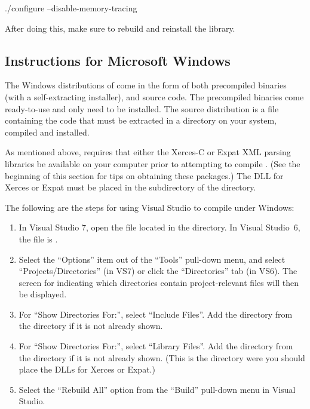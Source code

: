 \documentclass{sbmlmanual}
\begin{document}
\begin{example}[csh]
  ./configure --disable-memory-tracing
\end{example}

After doing this, make sure to rebuild and reinstall the \libsbml{} library.


\subsection{Instructions for Microsoft Windows}

The Windows distributions of \libsbml{} come in the form of both
precompiled binaries (with a self-extracting installer), and source code.
The precompiled binaries come ready-to-use and only need to be installed.
The source distribution is a  file containing the \libsbml{}
code that must be extracted in a directory on your system, compiled and
installed.

As mentioned above, \libsbml{} requires that either the Xerces-C or Expat
XML parsing libraries be available on your computer prior to attempting to
compile \libsbml{}.  (See the beginning of this section for tips on
obtaining these packages.)  The DLL for Xerces or Expat must be placed in
the  subdirectory of the \libsbml{} directory.

The following are the steps for using Visual Studio to compile \libsbml{}
under Windows:

\begin{enumerate}
  
\item In Visual Studio 7, open the file 
  located in the \libsbml{} directory.  In Visual Studio~6, the file is
  .
  
\item Select the ``Options'' item out of the ``Tools'' pull-down menu, and
  select ``Projects/Directories'' (in VS7) or click the ``Directories'' tab
  (in VS6).  The screen for indicating which directories contain
  project-relevant files will then be displayed.
  
\item For ``Show Directories For:'', select ``Include Files''.
  Add the  directory from the \libsbml{} directory if
  it is not already shown.
  
\item For ``Show Directories For:'', select ``Library Files''.  Add the
   directory from the \libsbml{} directory if it is not
  already shown.  (This is the directory were you should place the DLLs for
  Xerces or Expat.)
  
\item Select the ``Rebuild All'' option from the ``Build'' pull-down menu
  in Visual Studio.

\end{enumerate}
\end{document}
